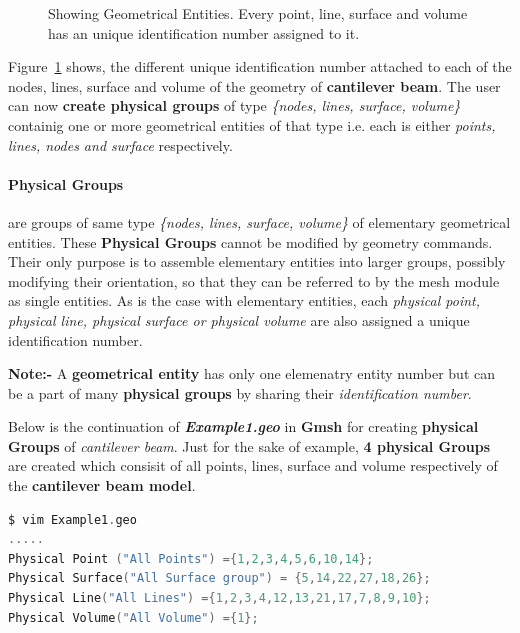 \documentclass[11pt]{article}
\begin{document}
\begin{figure}[h]
 \caption{\label{Geometric-entities}  Showing  Geometrical
  Entities.  Every  point, line, surface and volume has an unique identification
  number assigned to it.}

\end{figure}

Figure~\ref{Geometric-entities}  shows,  the  different  unique identification
number  attached  to  each  of  the  nodes,  lines,  surface and volume of the
geometry of \textbf{cantilever beam}. The user can now \textbf{create physical
groups}  of  type  \textit{\{nodes, lines, surface, volume\}} containig one or
more  geometrical  entities  of  that type i.e. each is either \textit{points,
lines, nodes and surface} respectively. 

\paragraph{Physical  Groups}  are  groups of same type \textit{\{nodes, lines,
surface,  volume\}} of elementary geometrical entities. These \textbf{Physical
Groups}  cannot  be  modified  by  geometry commands. Their only purpose is to
assemble  elementary  entities  into  larger  groups, possibly modifying their
orientation,  so  that  they  can  be referred to by the mesh module as single
entities.  As  is  the  case  with  elementary entities, each \textit{physical
point, physical line, physical surface or physical volume} are also assigned a
unique identification number. 

\textbf{Note:- } A \textbf{geometrical entity} has only one elemenatry entity 
number but can be a part of many \textbf{physical groups} by sharing their 
\textit{identification number}.

Below is the continuation of \textbf{\textit{Example1.geo}} in \textbf{Gmsh} 
for creating \textbf{physical Groups} of \textit{cantilever beam}. Just for 
the sake of example, \textbf{4 physical Groups} are created which consisit 
of all points, lines, surface and volume respectively of the 
\textbf{cantilever beam model}.

\begin{lstlisting}[language=C,backgroundcolor=\color{grayish}]
$ vim Example1.geo 
.....
Physical Point ("All Points") ={1,2,3,4,5,6,10,14};
Physical Surface("All Surface group") = {5,14,22,27,18,26};
Physical Line("All Lines") ={1,2,3,4,12,13,21,17,7,8,9,10};
Physical Volume("All Volume") ={1};
\end{lstlisting}
\end{document}
